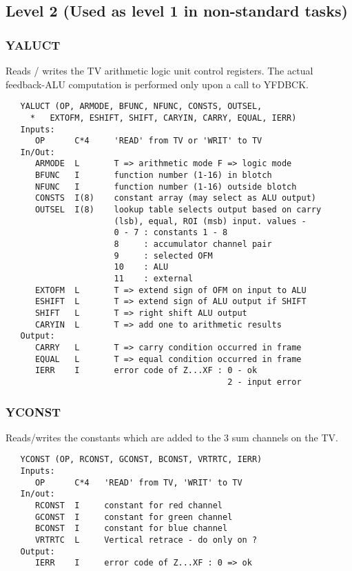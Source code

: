 \subsection{Level 2 (Used as level 1 in non-standard tasks)}

\subsubsection{YALUCT}
Reads / writes the TV arithmetic logic unit control
registers.  The actual feedback-ALU computation is performed only
upon a call to YFDBCK.
\begin{verbatim}
   YALUCT (OP, ARMODE, BFUNC, NFUNC, CONSTS, OUTSEL,
     *   EXTOFM, ESHIFT, SHIFT, CARYIN, CARRY, EQUAL, IERR)
   Inputs:
      OP      C*4     'READ' from TV or 'WRIT' to TV
   In/Out:
      ARMODE  L       T => arithmetic mode F => logic mode
      BFUNC   I       function number (1-16) in blotch
      NFUNC   I       function number (1-16) outside blotch
      CONSTS  I(8)    constant array (may select as ALU output)
      OUTSEL  I(8)    lookup table selects output based on carry
                      (lsb), equal, ROI (msb) input. values -
                      0 - 7 : constants 1 - 8
                      8     : accumulator channel pair
                      9     : selected OFM
                      10    : ALU
                      11    : external
      EXTOFM  L       T => extend sign of OFM on input to ALU
      ESHIFT  L       T => extend sign of ALU output if SHIFT
      SHIFT   L       T => right shift ALU output
      CARYIN  L       T => add one to arithmetic results
   Output:
      CARRY   L       T => carry condition occurred in frame
      EQUAL   L       T => equal condition occurred in frame
      IERR    I       error code of Z...XF : 0 - ok
                                             2 - input error

\end{verbatim}

\subsubsection{YCONST}
Reads/writes the constants which are added to the 3 sum
channels on the TV.
\begin{verbatim}
   YCONST (OP, RCONST, GCONST, BCONST, VRTRTC, IERR)
   Inputs:
      OP      C*4   'READ' from TV, 'WRIT' to TV
   In/out:
      RCONST  I     constant for red channel
      GCONST  I     constant for green channel
      BCONST  I     constant for blue channel
      VRTRTC  L     Vertical retrace - do only on ?
   Output:
      IERR    I     error code of Z...XF : 0 => ok

\end{verbatim}

